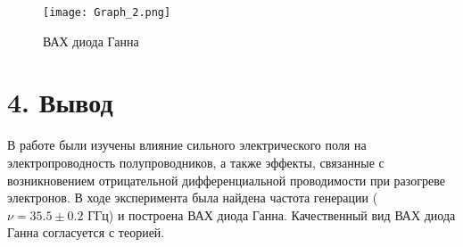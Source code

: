 \documentclass[a4paper,12pt]{report}
\begin{document}
\begin{figure}[H]
    \centering
    \texttt{[image: Graph\_2.png]}
    \caption{ВАХ диода Ганна}
    \label{fig:my_label}
\end{figure}

\section*{4. Вывод}
В работе были изучены влияние сильного электрического поля на электропроводность полупроводников, а также эффекты, связанные с возникновением отрицательной дифференциальной проводимости при разогреве электронов.
В ходе эксперимента была найдена частота генерации ($\nu = 35.5 \pm 0.2 \text{ ГГц}$) и построена ВАХ диода Ганна. Качественный вид ВАХ диода Ганна согласуется с теорией.
\end{document}
